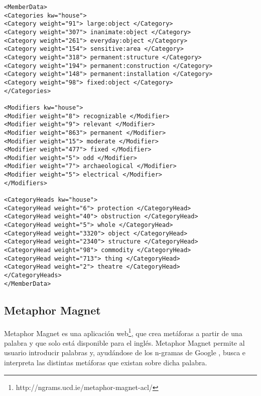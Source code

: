 \lstset{language=XML}
\begin{lstlisting}[caption=XML devuelto por Thesaurus Rex para la palabra \textit{house}, label={lst:xmlthesaurusrex}, frame=single]
<MemberData>
<Categories kw="house">
<Category weight="91"> large:object </Category>
<Category weight="307"> inanimate:object </Category>
<Category weight="261"> everyday:object </Category>
<Category weight="154"> sensitive:area </Category>
<Category weight="318"> permanent:structure </Category>
<Category weight="194"> permanent:construction </Category>
<Category weight="148"> permanent:installation </Category>
<Category weight="98"> fixed:object </Category>
</Categories>

<Modifiers kw="house">
<Modifier weight="8"> recognizable </Modifier>
<Modifier weight="9"> relevant </Modifier>
<Modifier weight="863"> permanent </Modifier>
<Modifier weight="15"> moderate </Modifier>
<Modifier weight="477"> fixed </Modifier>
<Modifier weight="5"> odd </Modifier>
<Modifier weight="7"> archaeological </Modifier>
<Modifier weight="5"> electrical </Modifier>
</Modifiers>

<CategoryHeads kw="house">
<CategoryHead weight="6"> protection </CategoryHead>
<CategoryHead weight="40"> obstruction </CategoryHead>
<CategoryHead weight="5"> whole </CategoryHead>
<CategoryHead weight="3320"> object </CategoryHead>
<CategoryHead weight="2340"> structure </CategoryHead>
<CategoryHead weight="98"> commodity </CategoryHead>
<CategoryHead weight="713"> thing </CategoryHead>
<CategoryHead weight="2"> theatre </CategoryHead>
</CategoryHeads>
</MemberData>

\end{lstlisting}



\subsection{Metaphor Magnet}
\label{cap:subsec:metaphormagnet}
Metaphor Magnet es una aplicación web\footnote{http://ngrams.ucd.ie/metaphor-magnet-acl/}, que crea metáforas a partir de una palabra y que solo está disponible para el inglés.
Metaphor Magnet permite al usuario introducir palabras y, ayudándose de los n-gramas de Google \citep{VealeT2012}, busca e interpreta las distintas metáforas que existan sobre dicha palabra.

